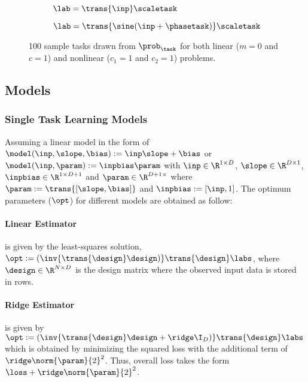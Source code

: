 \begin{figure}[ht!]
  \centering
  \begin{subfigure}[b]{0.49\textwidth}
    \centering
    \caption{$\lab = \trans{\inp}\scaletask$}
    \label{fig:lintasks}
  \end{subfigure}
  \begin{subfigure}[b]{0.49\textwidth}
    \centering
    \caption{$\lab = \trans{\sine(\inp+\phasetask)}\scaletask$}
    \label{fig:nonlintasks}
  \end{subfigure}
  \caption{100 sample tasks drawn from $\prob_\task$ for both linear ($m=0$ and $c=1$) and nonlinear ($c_1=1$ and $c_2=1$) problems.}
\end{figure}

\subsection{Models} 

\subsubsection{Single Task Learning Models}

Assuming a linear model in the form of $\model(\inp,\slope,\bias):=\inp\slope+\bias$ or $\model(\inp, \param):=\inpbias\param$ with $\inp\in\R^{1\times D}$, $\slope\in\R^{D\times 1}$, $\inpbias\in\R^{1\times D+1}$ and $\param\in\R^{D+1\times}$ where $\param:=\trans{[\slope, \bias]}$ and $\inpbias:=[\inp, 1]$. The optimum parameters ($\opt$) for different models are obtained as follow:

\paragraph{Linear Estimator} is given by the least-squares solution, $\opt:=(\inv{\trans{\design}\design)}\trans{\design}\labs$, where $\design\in\R^{N\times D}$ is the design matrix where the observed input data is stored in rows.

\paragraph{Ridge Estimator} is given by $\opt:=(\inv{\trans{\design}\design+\ridge \I_{D})}\trans{\design}\labs$ which is obtained by minimizing the squared loss with the additional term of $\ridge\norm{\param}{2}^2$. Thus, overall loss takes the form $\loss+\ridge\norm{\param}{2}^2$.


